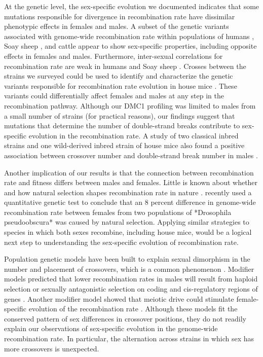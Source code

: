 \documentclass[9pt,lineno]{elife}
\begin{document}
At the genetic level, the sex-specific evolution we documented indicates that some mutations responsible for divergence in recombination rate have dissimilar phenotypic effects in females and males. A subset of the genetic variants associated with genome-wide recombination rate within populations of humans \citep{Kong2004, Kong2008, Kong2014, halldorsson2019}, Soay sheep \citep{johnston2016_soay}, and cattle  \citep{ma2015_cattle, Shen2018_cattle} appear to show sex-specific properties, including opposite effects in females and males. Furthermore, inter-sexual correlations for recombination rate are weak in humans \citep{fledel2011} and Soay sheep \citep{johnston2016_soay}. Crosses between the strains we surveyed could be used to identify and characterize the genetic variants responsible for recombination rate evolution in house mice \citep{dumont2011, Wang2017island, wang2019_SC}. These variants could differentially affect females and males at any step in the recombination pathway. Although our DMC1 profiling was limited to males from a small number of strains (for practical reasons), our findings suggest that mutations that determine the number of double-strand breaks contribute to sex-specific evolution in the recombination rate. A study of two classical inbred strains and one wild-derived inbred strain of house mice also found a positive association between crossover number and double-strand break number in males \citep{baier2014}.

Another implication of our results is that the connection between recombination rate and fitness differs between males and females. Little is known about whether and how natural selection shapes recombination rate in nature \citep{DapperPayseur2017, Ritz2017}.  \cite{samuk2020} recently used a quantitative genetic test to conclude that an 8 percent difference in genome-wide recombination rate between females from two populations of *Drosophila pseudoobscura* was caused by natural selection. Applying similar strategies to species in which both sexes recombine, including house mice, would be a logical next step to understanding the sex-specific evolution of recombination rate. 

Population genetic models have been built to explain sexual dimorphism in the number and placement of crossovers, which is a common phenomenon \citep{brandvain2012scrambling, sardell_sex_2020}. Modifier models predicted that lower recombination rates in males will result from haploid selection \citep{lenormand2003} or sexually antagonistic selection on coding and cis-regulatory regions of genes \citep{sardell_sex_2020}. Another modifier model showed that meiotic drive could stimulate female-specific evolution of the recombination rate \citep{brandvain2012scrambling}. Although these models fit the conserved pattern of sex differences in crossover positions, they do not readily explain our observations of sex-specific evolution in the genome-wide recombination rate. In particular, the alternation across strains in which sex has more crossovers is unexpected.
\end{document}
